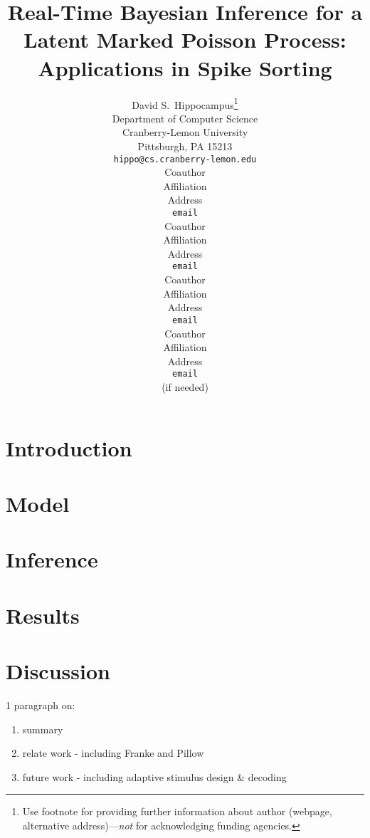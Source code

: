 \documentclass{article} %
\title{Real-Time Bayesian Inference for a Latent Marked Poisson Process: Applications in Spike Sorting}
\author{
David S.~Hippocampus\thanks{ Use footnote for providing further information
about author (webpage, alternative address)---\emph{not} for acknowledging
funding agencies.} \\
Department of Computer Science\\
Cranberry-Lemon University\\
Pittsburgh, PA 15213 \\
\texttt{hippo@cs.cranberry-lemon.edu} \\
\And
Coauthor \\
Affiliation \\
Address \\
\texttt{email} \\
\AND
Coauthor \\
Affiliation \\
Address \\
\texttt{email} \\
\And
Coauthor \\
Affiliation \\
Address \\
\texttt{email} \\
\And
Coauthor \\
Affiliation \\
Address \\
\texttt{email} \\
(if needed)\\
}
\begin{document}
\maketitle

\begin{abstract}


\end{abstract}

\section{Introduction}



 
\section{Model}


\section{Inference} \label{sec:inf}


\section{Results}


 
\section{Discussion}

1 paragraph on:
\begin{enumerate}
	\item summary
	\item relate work - including Franke and Pillow
	\item future work - including adaptive stimulus design \& decoding
\end{enumerate}


\begin{comment}
\subsubsection*{Acknowledgments}

Use unnumbered third level headings for the acknowledgments. All
acknowledgments go at the end of the paper. Do not include 
acknowledgments in the anonymized submission, only in the 
final paper. 
\end{comment}




\end{document}
